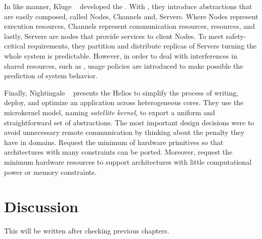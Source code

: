 	In like manner, Kluge \etal~\cite{kluge2014} developed the \moosca.
	With \moosca, they introduce abstractions that are easily composed, called Nodes,
	Channels and, Servers.
	Where Nodes represent execution resources, Channels represent communication
	resources, \ie \noc resources, and lastly, Servers are nodes that provide
	services to client Nodes.
	To meet safety-critical requirements, they partition \manycore and distribute
	replicas of Servers turning the whole system is predictable.
	However, in order to deal with interferences in shared resources, such as \noc,
	usage policies are introduced to make possible the prediction of system behavior.

	Finally, Nightingale \etal~\cite{nightingale2009} presents the Helios \os to
	simplify the process of writing, deploy, and optimize an application across
	heterogeneous cores.
	They use the microkernel model, naming \textit{satellite kernel}, to export
	a uniform and straightforward set of \os abstractions.
	The most important design decisions were to avoid unnecessary remote communication
	by thinking about the penalty they have in \numa domains.
	Request the minimum of hardware primitives so that architectures with many
	constraints can be ported.
	Moreover, request the minimum hardware resources to support architectures with little
	computational power or memory constraints.

\section{Discussion}

	This will be written after checking previous chapters.